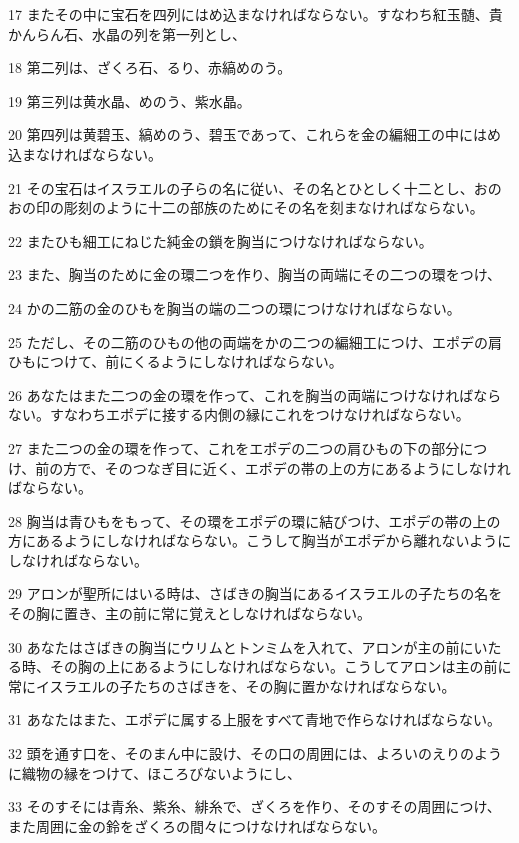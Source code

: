 \par 17 またその中に宝石を四列にはめ込まなければならない。すなわち紅玉髄、貴かんらん石、水晶の列を第一列とし、
\par 18 第二列は、ざくろ石、るり、赤縞めのう。
\par 19 第三列は黄水晶、めのう、紫水晶。
\par 20 第四列は黄碧玉、縞めのう、碧玉であって、これらを金の編細工の中にはめ込まなければならない。
\par 21 その宝石はイスラエルの子らの名に従い、その名とひとしく十二とし、おのおの印の彫刻のように十二の部族のためにその名を刻まなければならない。
\par 22 またひも細工にねじた純金の鎖を胸当につけなければならない。
\par 23 また、胸当のために金の環二つを作り、胸当の両端にその二つの環をつけ、
\par 24 かの二筋の金のひもを胸当の端の二つの環につけなければならない。
\par 25 ただし、その二筋のひもの他の両端をかの二つの編細工につけ、エポデの肩ひもにつけて、前にくるようにしなければならない。
\par 26 あなたはまた二つの金の環を作って、これを胸当の両端につけなければならない。すなわちエポデに接する内側の縁にこれをつけなければならない。
\par 27 また二つの金の環を作って、これをエポデの二つの肩ひもの下の部分につけ、前の方で、そのつなぎ目に近く、エポデの帯の上の方にあるようにしなければならない。
\par 28 胸当は青ひもをもって、その環をエポデの環に結びつけ、エポデの帯の上の方にあるようにしなければならない。こうして胸当がエポデから離れないようにしなければならない。
\par 29 アロンが聖所にはいる時は、さばきの胸当にあるイスラエルの子たちの名をその胸に置き、主の前に常に覚えとしなければならない。
\par 30 あなたはさばきの胸当にウリムとトンミムを入れて、アロンが主の前にいたる時、その胸の上にあるようにしなければならない。こうしてアロンは主の前に常にイスラエルの子たちのさばきを、その胸に置かなければならない。
\par 31 あなたはまた、エポデに属する上服をすべて青地で作らなければならない。
\par 32 頭を通す口を、そのまん中に設け、その口の周囲には、よろいのえりのように織物の縁をつけて、ほころびないようにし、
\par 33 そのすそには青糸、紫糸、緋糸で、ざくろを作り、そのすその周囲につけ、また周囲に金の鈴をざくろの間々につけなければならない。
